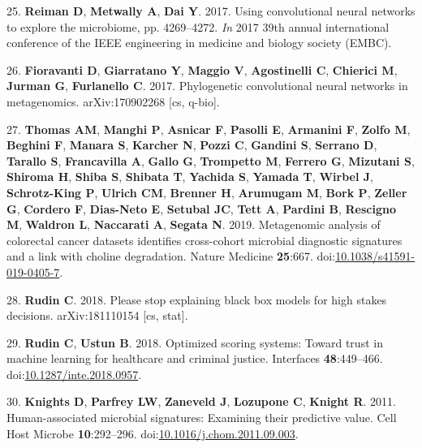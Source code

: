 \documentclass[11pt,]{article}
\begin{document}
\hypertarget{ref-reiman_using_2017}{}
25. \textbf{Reiman D}, \textbf{Metwally A}, \textbf{Dai Y}. 2017. Using
convolutional neural networks to explore the microbiome, pp. 4269--4272.
\emph{In} 2017 39th annual international conference of the IEEE
engineering in medicine and biology society (EMBC).

\hypertarget{ref-fioravanti_phylogenetic_2017}{}
26. \textbf{Fioravanti D}, \textbf{Giarratano Y}, \textbf{Maggio V},
\textbf{Agostinelli C}, \textbf{Chierici M}, \textbf{Jurman G},
\textbf{Furlanello C}. 2017. Phylogenetic convolutional neural networks
in metagenomics. arXiv:170902268 {[}cs, q-bio{]}.

\hypertarget{ref-thomas_metagenomic_2019}{}
27. \textbf{Thomas AM}, \textbf{Manghi P}, \textbf{Asnicar F},
\textbf{Pasolli E}, \textbf{Armanini F}, \textbf{Zolfo M},
\textbf{Beghini F}, \textbf{Manara S}, \textbf{Karcher N}, \textbf{Pozzi
C}, \textbf{Gandini S}, \textbf{Serrano D}, \textbf{Tarallo S},
\textbf{Francavilla A}, \textbf{Gallo G}, \textbf{Trompetto M},
\textbf{Ferrero G}, \textbf{Mizutani S}, \textbf{Shiroma H},
\textbf{Shiba S}, \textbf{Shibata T}, \textbf{Yachida S}, \textbf{Yamada
T}, \textbf{Wirbel J}, \textbf{Schrotz-King P}, \textbf{Ulrich CM},
\textbf{Brenner H}, \textbf{Arumugam M}, \textbf{Bork P}, \textbf{Zeller
G}, \textbf{Cordero F}, \textbf{Dias-Neto E}, \textbf{Setubal JC},
\textbf{Tett A}, \textbf{Pardini B}, \textbf{Rescigno M},
\textbf{Waldron L}, \textbf{Naccarati A}, \textbf{Segata N}. 2019.
Metagenomic analysis of colorectal cancer datasets identifies
cross-cohort microbial diagnostic signatures and a link with choline
degradation. Nature Medicine \textbf{25}:667.
doi:\href{https://doi.org/10.1038/s41591-019-0405-7}{10.1038/s41591-019-0405-7}.

\hypertarget{ref-rudin_please_2018}{}
28. \textbf{Rudin C}. 2018. Please stop explaining black box models for
high stakes decisions. arXiv:181110154 {[}cs, stat{]}.

\hypertarget{ref-rudin_optimized_2018}{}
29. \textbf{Rudin C}, \textbf{Ustun B}. 2018. Optimized scoring systems:
Toward trust in machine learning for healthcare and criminal justice.
Interfaces \textbf{48}:449--466.
doi:\href{https://doi.org/10.1287/inte.2018.0957}{10.1287/inte.2018.0957}.

\hypertarget{ref-knights_human-associated_2011}{}
30. \textbf{Knights D}, \textbf{Parfrey LW}, \textbf{Zaneveld J},
\textbf{Lozupone C}, \textbf{Knight R}. 2011. Human-associated microbial
signatures: Examining their predictive value. Cell Host Microbe
\textbf{10}:292--296.
doi:\href{https://doi.org/10.1016/j.chom.2011.09.003}{10.1016/j.chom.2011.09.003}.
\end{document}
